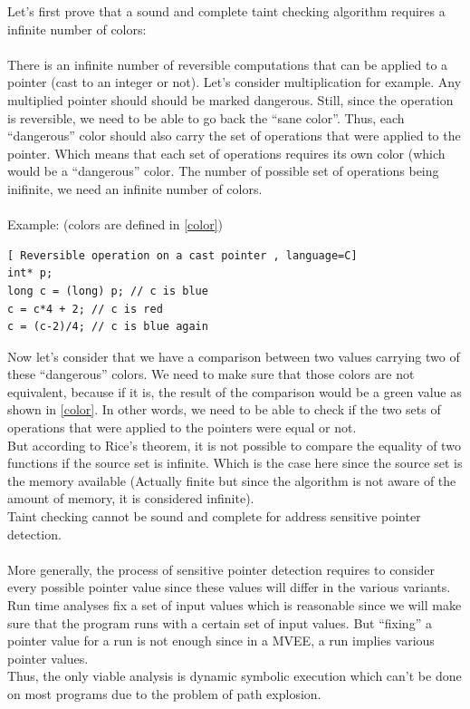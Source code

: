 \documentclass[english]{enstaPRE}
\begin{document}
Let's first prove that a sound and complete taint checking algorithm requires a infinite number of colors:\\ \\
There is an infinite number of reversible computations that can be applied to a pointer (cast to an integer or not). Let's consider multiplication for 
example. Any multiplied pointer should should be marked dangerous. Still, since the operation is reversible, we need to be able to go back the ``sane color''.
Thus, each ``dangerous'' color should also carry the set of operations that were applied to the pointer. Which means that each set of operations requires 
its own color (which would be a ``dangerous'' color. The number of possible set of operations being inifinite, we need an infinite number of colors.
\\ \\ 
Example: (colors are defined in \ref{color})

\begin{lstlisting}[ Reversible operation on a cast pointer , language=C]
int* p;
long c = (long) p; // c is blue  
c = c*4 + 2; // c is red
c = (c-2)/4; // c is blue again

\end{lstlisting}\label{color}

Now let's consider that we have a comparison between two values carrying two of these ``dangerous'' colors. We need to make sure that those colors are not 
equivalent, because if it is, the result of the comparison would be a green value as shown in \ref{color}. In other words, we need to be able to check 
if the two sets of operations that were applied to the pointers were equal or not. \\
But according to Rice's theorem, it is not possible to compare the equality of two functions if the source set is infinite. Which is the case here since the 
source set is the memory available (Actually finite but since the algorithm is not aware of the amount of memory, it is considered infinite).
\\
Taint checking cannot be sound and complete for address sensitive pointer detection.
\\ \\
More generally, the process of sensitive pointer detection requires to consider every possible pointer value since these values will differ in the 
various variants. Run time analyses fix a set of input values which is reasonable since we will make sure that the program runs with a certain 
set of input values. But ``fixing'' a pointer value for a run is not enough since in a MVEE, a run implies various pointer values.
\\
Thus, the only viable analysis is dynamic symbolic execution \cite{dynamic} 
which can't be done on most programs due to the problem of path explosion.\\
 
\end{document}
